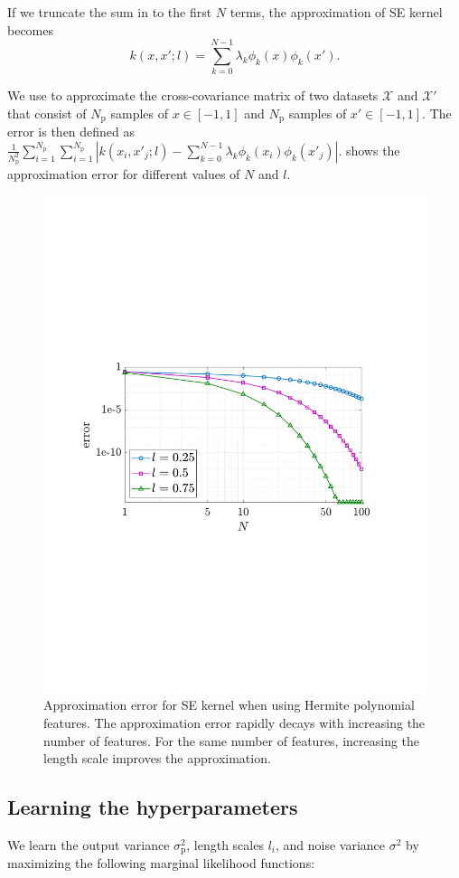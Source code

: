 \documentclass{article}
\begin{document}
If we truncate the sum in  to the first $N$ terms, the approximation of SE kernel becomes
\begin{equation}\label{eqn622}
	k(x, x'; l) = \sum_{k=0}^{N-1} \lambda_k \phi_k(x) \phi_k(x').
\end{equation}

We use  to approximate the cross-covariance matrix of two datasets $\mathcal{X}$ and $\mathcal{X}'$ that consist of $N_\text{p}$ samples of $x \in [-1,1]$ and $N_\text{p}$ samples of $x' \in [-1,1]$.
The error is then defined as $\frac{1}{N_\text{p}^2} \sum_{i=1}^{N_\text{p}} \sum_{i=1}^{N_\text{p}}| k(x_i,x'_j;l) -  \sum_{k=0}^{N-1} \lambda_k \phi_k(x_i) \phi_k(x'_j)|$.
 shows the approximation error for different values of $N$ and $l$.

\begin{figure}[t]
	\centering
	\includegraphics[width=0.6\linewidth]{img/approxError.pdf}
	\caption{Approximation error for SE kernel when using Hermite polynomial features. The approximation error rapidly decays with increasing the number of features. For the same number of features, increasing the length scale improves the approximation.}
	\label{fig:approxError}
\end{figure}

\subsection{Learning the hyperparameters}
\label{sec:hyperparameters}
We learn the output variance $\sigma^2_\text{p}$, length scales $l_i$, and noise variance $\sigma^2$ by maximizing the following marginal likelihood functions:
\end{document}
